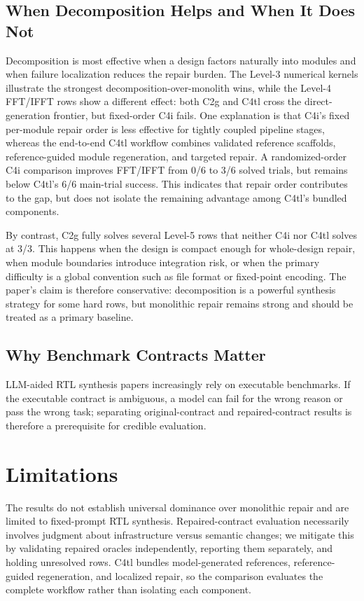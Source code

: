 \documentclass[sigconf,anonymous]{acmart}
\newcommand{\cTwoG}{C2g\xspace}
\newcommand{\cFourI}{C4i\xspace}
\newcommand{\cFourTL}{C4tl\xspace}
\begin{document}
\subsection{When Decomposition Helps and When It Does Not}

Decomposition is most effective when a design factors naturally into modules and when failure localization reduces the repair burden.
The Level-3 numerical kernels illustrate the strongest decomposition-over-monolith wins, while the Level-4 FFT/IFFT rows show a different effect: both \cTwoG and \cFourTL cross the direct-generation frontier, but fixed-order \cFourI fails.
One explanation is that \cFourI's fixed per-module repair order is less effective for tightly coupled pipeline stages, whereas the end-to-end \cFourTL workflow combines validated reference scaffolds, reference-guided module regeneration, and targeted repair.
A randomized-order \cFourI comparison improves FFT/IFFT from 0/6 to 3/6 solved trials, but remains below \cFourTL's 6/6 main-trial success. This indicates that repair order contributes to the gap, but does not isolate the remaining advantage among \cFourTL's bundled components.

By contrast, \cTwoG fully solves several Level-5 rows that neither \cFourI nor \cFourTL solves at 3/3.
This happens when the design is compact enough for whole-design repair, when module boundaries introduce integration risk, or when the primary difficulty is a global convention such as file format or fixed-point encoding.
The paper's claim is therefore conservative: decomposition is a powerful synthesis strategy for some hard rows, but monolithic repair remains strong and should be treated as a primary baseline.

\subsection{Why Benchmark Contracts Matter}

LLM-aided RTL synthesis papers increasingly rely on executable benchmarks.
If the executable contract is ambiguous, a model can fail for the wrong reason or pass the wrong task; separating original-contract and repaired-contract results is therefore a prerequisite for credible evaluation.

\section{Limitations}

The results do not establish universal dominance over monolithic repair and are limited to fixed-prompt RTL synthesis.
Repaired-contract evaluation necessarily involves judgment about infrastructure versus semantic changes; we mitigate this by validating repaired oracles independently, reporting them separately, and holding unresolved rows.
\cFourTL bundles model-generated references, reference-guided regeneration, and localized repair, so the comparison evaluates the complete workflow rather than isolating each component.
\end{document}
